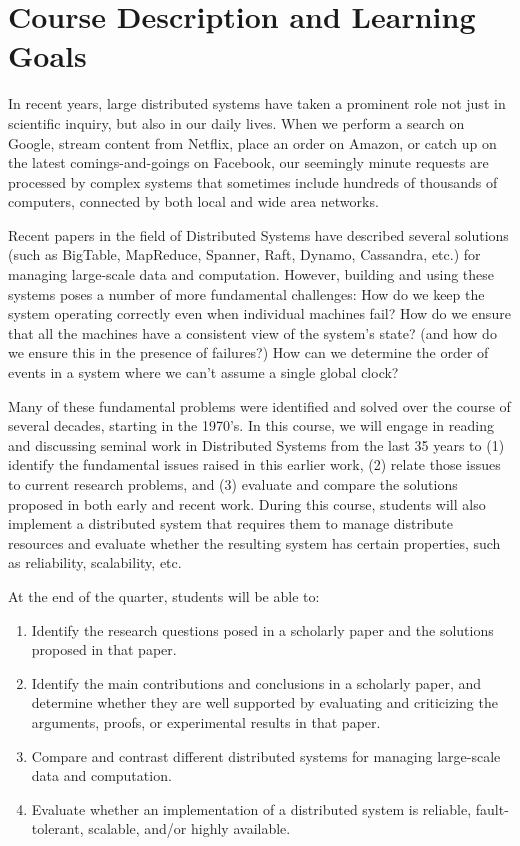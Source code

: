\documentclass[11pt]{article}
\begin{document}
\pagebreak

\section{Course Description and Learning Goals}

In recent years, large distributed systems have taken a prominent role not just in scientific inquiry, but also in our daily lives. When we perform a search on Google, stream content from Netflix, place an order on Amazon, or catch up on the latest comings-and-goings on Facebook, our seemingly minute requests are processed by complex systems that sometimes include hundreds of thousands of computers, connected by both local and wide area networks.

Recent papers in the field of Distributed Systems have described several solutions (such as BigTable, MapReduce, Spanner, Raft, Dynamo, Cassandra, etc.) for managing large-scale data and computation. However, building and using these systems poses a number of more fundamental challenges: How do we keep the system operating correctly even when individual machines fail? How do we ensure that all the machines have a consistent view of the system's state? (and how do we ensure this in the presence of failures?) How can we determine the order of events in a system where we can't assume a single global clock?

Many of these fundamental problems were identified and solved over the course of several decades, starting in the 1970's. In this course, we will engage in reading and discussing seminal work in Distributed Systems from the last 35 years to (1) identify the fundamental issues raised in this earlier work, (2) relate those issues to current research problems, and (3) evaluate and compare the solutions proposed in both early and recent work. During this course, students will also implement a distributed system that requires them to manage distribute resources and evaluate whether the resulting system has certain properties, such as reliability, scalability, etc.

At the end of the quarter, students will be able to:

\begin{enumerate}
 \item Identify the research questions posed in a scholarly paper and the solutions proposed in that paper.
 \item Identify the main contributions and conclusions in a scholarly paper, and determine whether they are well supported by evaluating and criticizing the arguments, proofs, or experimental results in that paper.
 \item Compare and contrast different distributed systems for managing large-scale data and computation.
 \item Evaluate whether an implementation of a distributed system is reliable, fault-tolerant, scalable, and/or highly available.
\end{enumerate}
\end{document}
